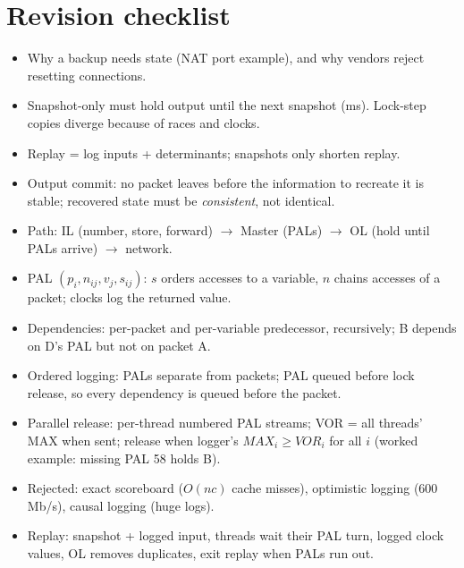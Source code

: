 \section{Revision checklist}
\begin{itemize}
  \item Why a backup needs state (NAT port example), and why vendors reject resetting connections.
  \item Snapshot-only must hold output until the next snapshot (ms). Lock-step copies diverge because of races and clocks.
  \item Replay = log inputs + determinants; snapshots only shorten replay.
  \item Output commit: no packet leaves before the information to recreate it is stable; recovered state must be \emph{consistent}, not identical.
  \item Path: IL (number, store, forward) $\to$ Master (PALs) $\to$ OL (hold until PALs arrive) $\to$ network.
  \item PAL $(p_i, n_{ij}, v_j, s_{ij})$: $s$ orders accesses to a variable, $n$ chains accesses of a packet; clocks log the returned value.
  \item Dependencies: per-packet and per-variable predecessor, recursively; B depends on D's PAL but not on packet A.
  \item Ordered logging: PALs separate from packets; PAL queued before lock release, so every dependency is queued before the packet.
  \item Parallel release: per-thread numbered PAL streams; VOR = all threads' MAX when sent; release when logger's $MAX_i \ge VOR_i$ for all $i$
        (worked example: missing PAL 58 holds B).
  \item Rejected: exact scoreboard ($O(nc)$ cache misses), optimistic logging (600\,Mb/s), causal logging (huge logs).
  \item Replay: snapshot + logged input, threads wait their PAL turn, logged clock values, OL removes duplicates, exit replay when PALs run out.
\end{itemize}
